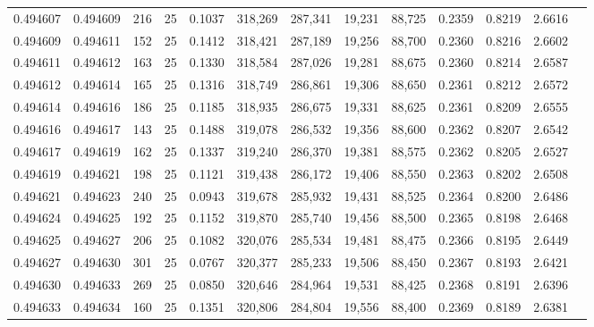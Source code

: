 \begin{tabular}{rrrrrrrrrrrrr}
0.494607 & 0.494609 &   216 &  25 &                                     0.1037 & 318,269 & 287,341 &  19,231 &  88,725 & 0.2359 & 0.8219 & 2.6616 \\
0.494609 & 0.494611 &   152 &  25 &                                     0.1412 & 318,421 & 287,189 &  19,256 &  88,700 & 0.2360 & 0.8216 & 2.6602 \\
0.494611 & 0.494612 &   163 &  25 &                                     0.1330 & 318,584 & 287,026 &  19,281 &  88,675 & 0.2360 & 0.8214 & 2.6587 \\
0.494612 & 0.494614 &   165 &  25 &                                     0.1316 & 318,749 & 286,861 &  19,306 &  88,650 & 0.2361 & 0.8212 & 2.6572 \\
0.494614 & 0.494616 &   186 &  25 &                                     0.1185 & 318,935 & 286,675 &  19,331 &  88,625 & 0.2361 & 0.8209 & 2.6555 \\
0.494616 & 0.494617 &   143 &  25 &                                     0.1488 & 319,078 & 286,532 &  19,356 &  88,600 & 0.2362 & 0.8207 & 2.6542 \\
0.494617 & 0.494619 &   162 &  25 &                                     0.1337 & 319,240 & 286,370 &  19,381 &  88,575 & 0.2362 & 0.8205 & 2.6527 \\
0.494619 & 0.494621 &   198 &  25 &                                     0.1121 & 319,438 & 286,172 &  19,406 &  88,550 & 0.2363 & 0.8202 & 2.6508 \\
0.494621 & 0.494623 &   240 &  25 &                                     0.0943 & 319,678 & 285,932 &  19,431 &  88,525 & 0.2364 & 0.8200 & 2.6486 \\
0.494624 & 0.494625 &   192 &  25 &                                     0.1152 & 319,870 & 285,740 &  19,456 &  88,500 & 0.2365 & 0.8198 & 2.6468 \\
0.494625 & 0.494627 &   206 &  25 &                                     0.1082 & 320,076 & 285,534 &  19,481 &  88,475 & 0.2366 & 0.8195 & 2.6449 \\
0.494627 & 0.494630 &   301 &  25 &                                     0.0767 & 320,377 & 285,233 &  19,506 &  88,450 & 0.2367 & 0.8193 & 2.6421 \\
0.494630 & 0.494633 &   269 &  25 &                                     0.0850 & 320,646 & 284,964 &  19,531 &  88,425 & 0.2368 & 0.8191 & 2.6396 \\
0.494633 & 0.494634 &   160 &  25 &                                     0.1351 & 320,806 & 284,804 &  19,556 &  88,400 & 0.2369 & 0.8189 & 2.6381 \\

\end{tabular}
